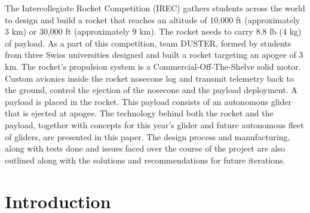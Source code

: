 \documentclass[]{iac}
\begin{document}
{The Intercollegiate Rocket Competition (IREC) gathers students across the world to design and build a rocket that reaches an altitude of 10,000 ft (approximately 3 km) or 30,000 ft (approximately 9 km). The rocket needs to carry 8.8 lb (4 kg) of payload. As a part of this competition, team DUSTER, formed by students from three Swiss universities designed and built a rocket targeting an apogee of 3 km. The rocket's propulsion system is a Commercial-Off-The-Shelve solid motor. 
Custom avionics inside the rocket nosecone log and transmit telemetry back to the ground, control the ejection of the nosecone and the payload deployment.
A payload is placed in the rocket. This payload consists of an autonomous glider that is ejected at apogee.
The technology behind both the rocket and the payload, together with concepts for this year's glider and future autonomous fleet of gliders, are presented in this paper. The design process and manufacturing, along with tests done and issues faced over the course of the project are also outlined along with the solutions and recommendations for future iterations.
}

\maketitle
\section{Introduction}



\end{document}
